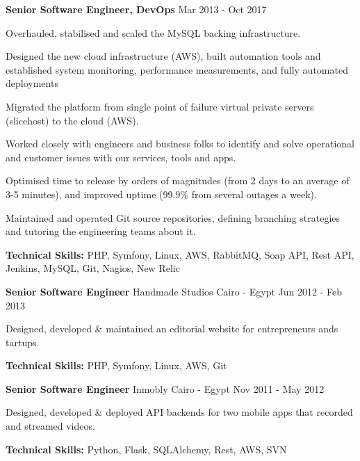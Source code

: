 \begin{cventries}
	\cventry
	{\textbf{Senior Software Engineer, DevOps}} %
	{} %
	{} %
	{Mar 2013 - Oct 2017} %
	{
		\begin{cvitems} %
			\item {Overhauled, stabilised and scaled the MySQL backing infrastructure.}
			\item {Designed the new cloud infrastructure (AWS), built automation tools and established
			            system monitoring, performance measurements, and fully automated deployments}
			\item {Migrated the platform from single point of failure virtual private servers
			            (slicehost) to the cloud (AWS).}
			\item {Worked closely with engineers and business folks to identify and solve operational
			            and customer issues with our services, tools and apps.}
			\item {Optimised time to release by orders of magnitudes (from 2 days to an average of 3-5
			            minutes), and improved uptime (99.9\% from several outages a week).}
			\item {Maintained and operated Git source repositories, defining branching strategies and
			            tutoring the engineering teams about it.}
			\item {\textbf{Technical Skills:} PHP, Symfony, Linux, AWS, RabbitMQ, Soap API, Rest API,
			            Jenkins, MySQL, Git, Nagios, New Relic}
		\end{cvitems}
	}

	\cventry
	{\textbf{Senior Software Engineer}} %
	{Handmade Studios} %
	{Cairo - Egypt} %
	{Jun 2012 - Feb 2013} %
	{
		\begin{cvitems} %
			\item {Designed, developed \& maintained an editorial website for entrepreneurs ands
			            tartups.}
			\item {\textbf{Technical Skills:} PHP, Symfony, Linux, AWS, Git}
		\end{cvitems}
	}


	\cventry
	{\textbf{Senior Software Engineer}} %
	{Inmobly} %
	{Cairo - Egypt} %
	{Nov 2011 - May 2012} %
	{
		\begin{cvitems} %
			\item {Designed, developed \& deployed API backends for two mobile apps that recorded and streamed videos.}
			\item {\textbf{Technical Skills:} Python, Flask, SQLAlchemy, Rest, AWS, SVN}
		\end{cvitems}
	}


\end{cventries}
